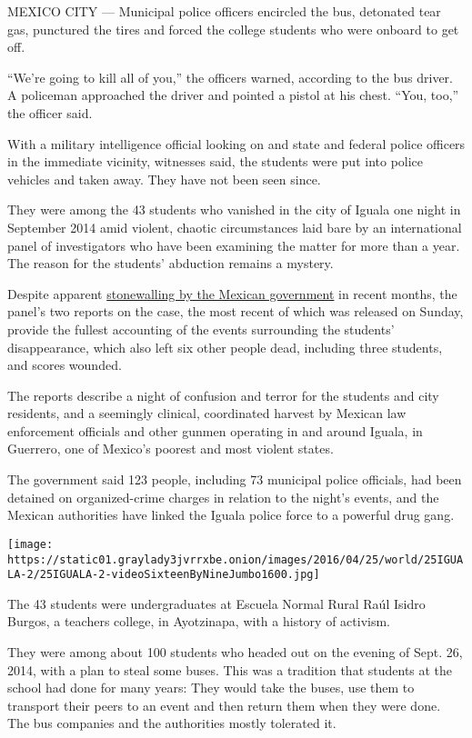 MEXICO CITY --- Municipal police officers encircled the bus, detonated
tear gas, punctured the tires and forced the college students who were
onboard to get off.

``We're going to kill all of you,'' the officers warned, according to
the bus driver. A policeman approached the driver and pointed a pistol
at his chest. ``You, too,'' the officer said.

With a military intelligence official looking on and state and federal
police officers in the immediate vicinity, witnesses said, the students
were put into police vehicles and taken away. They have not been seen
since.

They were among the 43 students who vanished in the city of Iguala one
night in September 2014 amid violent, chaotic circumstances laid bare by
an international panel of investigators who have been examining the
matter for more than a year. The reason for the students' abduction
remains a mystery.

Despite apparent
\href{http://www.nytimes3xbfgragh.onion/2016/04/23/world/americas/investigators-say-mexico-has-thwarted-efforts-to-solve-students-disappearance.html?_r=0}{stonewalling
by the Mexican government} in recent months, the panel's two reports on
the case, the most recent of which was released on Sunday, provide the
fullest accounting of the events surrounding the students'
disappearance, which also left six other people dead, including three
students, and scores wounded.

The reports describe a night of confusion and terror for the students
and city residents, and a seemingly clinical, coordinated harvest by
Mexican law enforcement officials and other gunmen operating in and
around Iguala, in Guerrero, one of Mexico's poorest and most violent
states.

The government said 123 people, including 73 municipal police officials,
had been detained on organized-crime charges in relation to the night's
events, and the Mexican authorities have linked the Iguala police force
to a powerful drug gang.

\texttt{[image: https://static01.graylady3jvrrxbe.onion/images/2016/04/25/world/25IGUALA-2/25IGUALA-2-videoSixteenByNineJumbo1600.jpg]}

The 43 students were undergraduates at Escuela Normal Rural Raúl Isidro
Burgos, a teachers college, in Ayotzinapa, with a history of activism.

They were among about 100 students who headed out on the evening of
Sept. 26, 2014, with a plan to steal some buses. This was a tradition
that students at the school had done for many years: They would take the
buses, use them to transport their peers to an event and then return
them when they were done. The bus companies and the authorities mostly
tolerated it.

